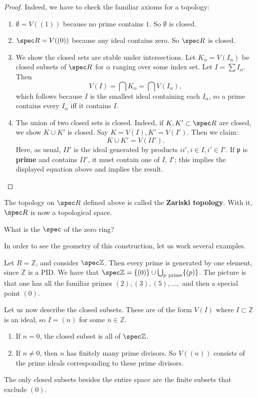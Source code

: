 \begin{proof} 
Indeed, we have to check the familiar axioms for a topology:
\begin{enumerate}
\item $\emptyset = V((1))$ because no prime contains $1$. So
$\emptyset$ is closed.
\item $\spec R = V((0))$ because any ideal contains zero. So
$\spec R$ is
closed.
\item We show the closed sets are stable under intersections.
Let
$K_{\alpha} = V(I_{\alpha})$ be closed subsets of $\spec R$ for
$\alpha$
ranging over some index set.  Let $I
= \sum I_{\alpha}$. Then 
\[ V(I) = \bigcap K_{\alpha} = \bigcap V(I_{\alpha}),  \]
which follows because $I$ is the smallest ideal containing each
$I_{\alpha}$,
so a prime contains every $I_{\alpha}$ iff it contains $I$.  
\item The union of two closed sets is closed. Indeed, if $K,K'
\subset \spec
R$ are closed, we show $K \cup K'$ is closed. Say $K= V(I), K' =
V(I')$. Then
we claim: 
\[ K \cup K'  = V(II').  \]
Here, as usual, $II'$ is the ideal generated by products $ii', i \in I, i'
\in I'$. If
$\mathfrak{p}$ is \textbf{prime} and contains $II'$, it must
contain one of $I$, $I'$;
this implies the displayed equation above and implies the
result.
\end{enumerate}
\end{proof} 
\begin{definition} 
The topology on $\spec R$ defined above is called the
\textbf{Zariski
topology}. With it,  $\spec R$ is now a topological space.
\end{definition} 

\begin{exercise} 
What is the $\spec$ of the zero ring?
\end{exercise} 

In order to see the geometry of this construction, let us work
several examples.

\begin{example} 
Let $R = \mathbb{Z}$, and consider $\spec \mathbb{Z}$. Then
every prime is generated by one element, since
$\mathbb{Z}$ is a PID. We have that $\spec \mathbb{Z} = \{(0)\}
\cup \bigcup_{p \
\mathrm{prime}} \{ (p)\}$. The picture is that one has all the
familiar primes $(2), (3),
(5), \dots, $ and then a special point $(0)$.

Let us now describe the closed subsets. These are of the form
$V(I)$ where $I
\subset \mathbb{Z}$ is an ideal, so $I = (n)$ for some $n \in
\mathbb{Z}$.

\begin{enumerate}
\item If $n=0$, the closed subset is all of $\spec \mathbb{Z}$.
\item If $n \neq 0$, then $n$ has finitely many prime divisors.
So $V((n))$ consists
of the prime ideals corresponding to these prime divisors.  
\end{enumerate}

The only closed subsets besides the entire space are the finite
subsets
that exclude $(0)$.  
\end{example} 

